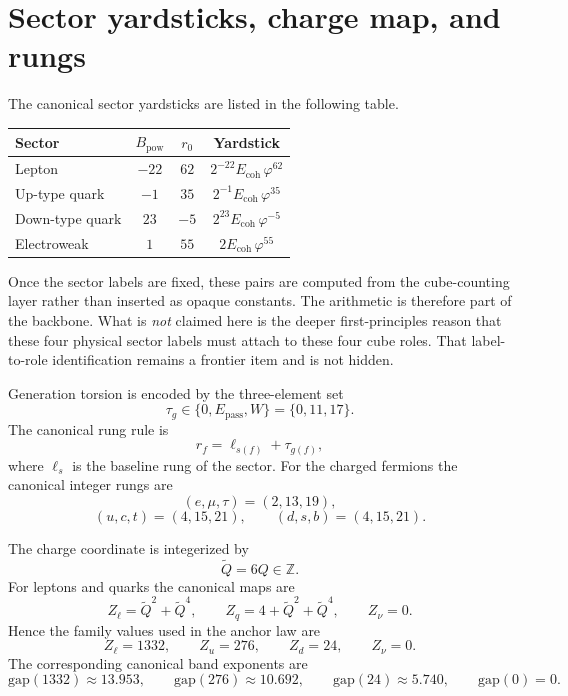 \documentclass[11pt]{article}
\newcommand{\phig}{\varphi}
\newcommand{\Epass}{E_{\mathrm{pass}}}
\newcommand{\Ecoh}{E_{\mathrm{coh}}}
\newcommand{\Bpow}{B_{\mathrm{pow}}}
\begin{document}
\section{Sector yardsticks, charge map, and rungs}

The canonical sector yardsticks are listed in the following table.

\begin{center}
\begin{tabular}{|l|c|c|c|}
\hline
Sector & \(\Bpow\) & \(r_0\) & Yardstick \\
\hline
Lepton & \(-22\) & \(62\) & \(2^{-22}\Ecoh\,\phig^{62}\) \\
Up-type quark & \(-1\) & \(35\) & \(2^{-1}\Ecoh\,\phig^{35}\) \\
Down-type quark & \(23\) & \(-5\) & \(2^{23}\Ecoh\,\phig^{-5}\) \\
Electroweak & \(1\) & \(55\) & \(2\Ecoh\,\phig^{55}\) \\
\hline
\end{tabular}
\end{center}

Once the sector labels are fixed, these pairs are computed from the cube-counting layer rather than inserted as opaque constants. The arithmetic is therefore part of the backbone. What is \emph{not} claimed here is the deeper first-principles reason that these four physical sector labels must attach to these four cube roles. That label-to-role identification remains a frontier item and is not hidden.

Generation torsion is encoded by the three-element set
\[
  \tau_g \in \{0,\Epass,W\} = \{0,11,17\}.
\]
The canonical rung rule is
\[
  r_f = \ell_{s(f)} + \tau_{g(f)},
\]
where \(\ell_s\) is the baseline rung of the sector. For the charged fermions the canonical integer rungs are
\[
  (e,\mu,\tau) = (2,13,19),
\]
\[
  (u,c,t) = (4,15,21),
  \qquad
  (d,s,b) = (4,15,21).
\]

The charge coordinate is integerized by
\[
  \tilde Q = 6Q \in \mathbb{Z}.
\]
For leptons and quarks the canonical maps are
\[
  Z_{\ell} = \tilde Q^2 + \tilde Q^4,
  \qquad
  Z_q = 4 + \tilde Q^2 + \tilde Q^4,
  \qquad
  Z_{\nu}=0.
\]
Hence the family values used in the anchor law are
\[
  Z_{\ell}=1332,
  \qquad
  Z_u=276,
  \qquad
  Z_d=24,
  \qquad
  Z_{\nu}=0.
\]
The corresponding canonical band exponents are
\[
  \mathrm{gap}(1332)\approx 13.953,
  \qquad
  \mathrm{gap}(276)\approx 10.692,
  \qquad
  \mathrm{gap}(24)\approx 5.740,
  \qquad
  \mathrm{gap}(0)=0.
\]
\end{document}
